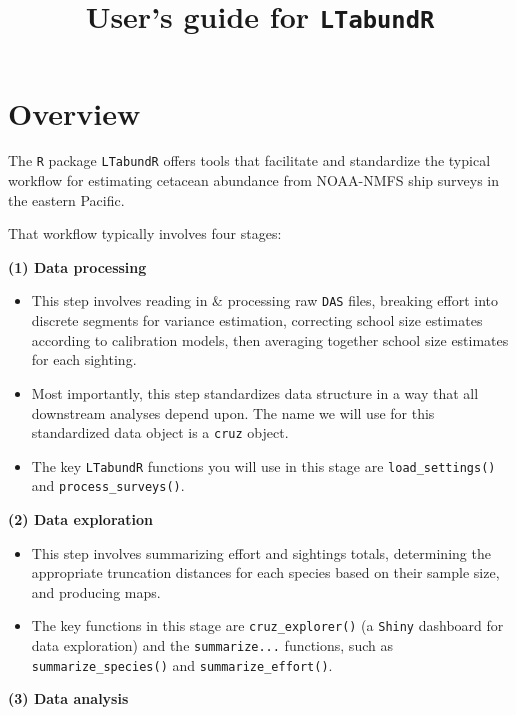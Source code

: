 \documentclass[
]{book}
\title{User's guide for \texttt{LTabundR}}
\author{}
\date{\vspace{-2.5em}}
\begin{document}
\maketitle

{
\setcounter{tocdepth}{1}
\tableofcontents
}
\hypertarget{overview}{%
\chapter*{Overview}\label{overview}}

The \texttt{R} package \texttt{LTabundR} offers tools that facilitate and standardize the typical workflow for estimating cetacean abundance from NOAA-NMFS ship surveys in the eastern Pacific.

That workflow typically involves four stages:

\textbf{(1) Data processing}

\begin{itemize}
\item
  This step involves reading in \& processing raw \texttt{DAS} files, breaking effort into discrete segments for variance estimation, correcting school size estimates according to calibration models, then averaging together school size estimates for each sighting.
\item
  Most importantly, this step standardizes data structure in a way that all downstream analyses depend upon. The name we will use for this standardized data object is a \texttt{cruz} object.
\item
  The key \texttt{LTabundR} functions you will use in this stage are \texttt{load\_settings()} and \texttt{process\_surveys()}.
\end{itemize}

\textbf{(2) Data exploration}

\begin{itemize}
\item
  This step involves summarizing effort and sightings totals, determining the appropriate truncation distances for each species based on their sample size, and producing maps.
\item
  The key functions in this stage are \texttt{cruz\_explorer()} (a \texttt{Shiny} dashboard for data exploration) and the \texttt{summarize...} functions, such as \texttt{summarize\_species()} and \texttt{summarize\_effort()}.
\end{itemize}

\textbf{(3) Data analysis}
\end{document}
